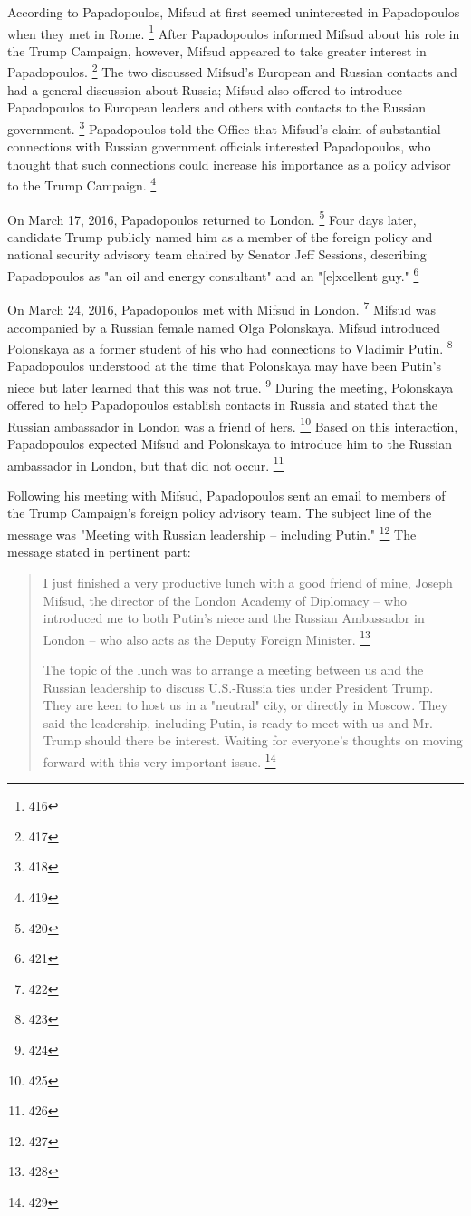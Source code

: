 According to Papadopoulos, Mifsud at first seemed uninterested in Papadopoulos when they met in Rome.%
\footnote{416}
After Papadopoulos informed Mifsud about his role in the Trump Campaign, however, Mifsud appeared to take greater interest in Papadopoulos.%
\footnote{417}
The two discussed Mifsud's European and Russian contacts and had a general discussion about Russia; Mifsud also offered to introduce Papadopoulos to European leaders and others with contacts to the Russian government.%
\footnote{418}
Papadopoulos told the Office that Mifsud's claim of substantial connections with Russian government officials interested Papadopoulos, who thought that such connections could increase his importance as a policy advisor to the Trump Campaign.%
\footnote{419}

On March 17, 2016, Papadopoulos returned to London.%
\footnote{420}
Four days later, candidate Trump publicly named him as a member of the foreign policy and national security advisory team chaired by Senator Jeff Sessions, describing Papadopoulos as "an oil and energy consultant" and an "[e]xcellent guy."%
\footnote{421}

On March 24, 2016, Papadopoulos met with Mifsud in London.%
\footnote{422}
Mifsud was accompanied by a Russian female named Olga Polonskaya.
Mifsud introduced Polonskaya as a former student of his who had connections to Vladimir Putin.%
\footnote{423}
Papadopoulos understood at the time that Polonskaya may have been Putin's niece but later learned that this was not true.%
\footnote{424}
During the meeting, Polonskaya offered to help Papadopoulos establish contacts in Russia and stated that the Russian ambassador in London was a friend of hers.%
\footnote{425}
Based on this interaction, Papadopoulos expected Mifsud and Polonskaya to introduce him to the Russian ambassador in London, but that did not occur.%
\footnote{426}

Following his meeting with Mifsud, Papadopoulos sent an email to members of the Trump Campaign's foreign policy advisory team. The subject line of the message was "Meeting with Russian leadership -- including Putin."%
\footnote{427}
The message stated in pertinent part:

\begin{quote}
I just finished a very productive lunch with a good friend of mine, Joseph Mifsud, the director of the London Academy of Diplomacy -- who introduced me to both Putin's niece and the Russian Ambassador in London -- who also acts as the Deputy Foreign Minister.%
\footnote{428}

The topic of the lunch was to arrange a meeting between us and the Russian leadership to discuss U.S.-Russia ties under President Trump.
They are keen to host us in a "neutral" city, or directly in Moscow.
They said the leadership, including Putin, is ready to meet with us and Mr. Trump should there be interest.
Waiting for everyone's thoughts on moving forward with this very important issue.%
\footnote{429}
\end{quote}

